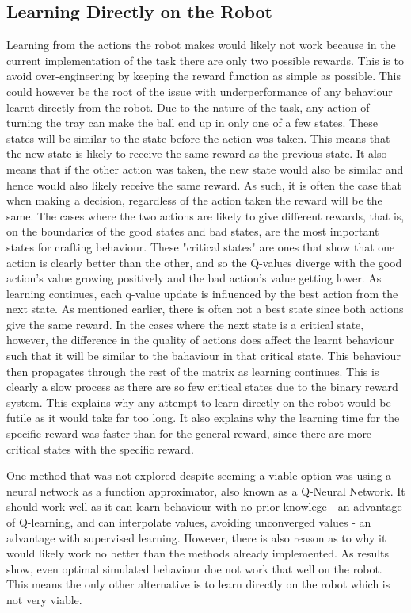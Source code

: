 \documentclass[12pt,a4paper]{article}
\begin{document}
\subsection{Learning Directly on the Robot}
Learning from the actions the robot makes would likely not work because in the current implementation of the task there are only two possible rewards. This is to avoid over-engineering by keeping the reward function as simple as possible. This could however be the root of the issue with underperformance of any behaviour learnt directly from the robot. Due to the nature of the task, any action of turning the tray can make the ball end up in only one of a few states. These states will be similar to the state before the action was taken. This means that the new state is likely to receive the same reward as the previous state. It also means that if the other action was taken, the new state would also be similar and hence would also likely receive the same reward. As such, it is often the case that when making a decision, regardless of the action taken the reward will be the same. The cases where the two actions are likely to give different rewards, that is, on the boundaries of the good states and bad states, are the most important states for crafting behaviour. These "critical states" are ones that show that one action is clearly better than the other, and so the Q-values diverge with the good action's value growing positively and the bad action's value getting lower. As learning continues, each q-value update is influenced by the best action from the next state. As mentioned earlier, there is often not a best state since both actions give the same reward. In the cases where the next state is a critical state, however, the difference in the quality of actions does affect the learnt behaviour such that it will be similar to the bahaviour in that critical state. This behaviour then propagates through the rest of the matrix as learning continues. This is clearly a slow process as there are so few critical states due to the binary reward system. This explains why any attempt to learn directly on the robot would be futile as it would take far too long. It also explains why the learning time for the specific reward was faster than for the general reward, since there are more critical states with the specific reward.

One method that was not explored despite seeming a viable option was using a neural network as a function approximator, also known as a Q-Neural Network. It should work well as it can learn behaviour with no prior knowlege - an advantage of Q-learning, and can interpolate values, avoiding unconverged values - an advantage with supervised learning. However, there is also reason as to why it would likely work no better than the methods already implemented. As results show, even optimal simulated behaviour doe not work that well on the robot. This means the only other alternative is to learn directly on the robot which is not very viable.
\end{document}

